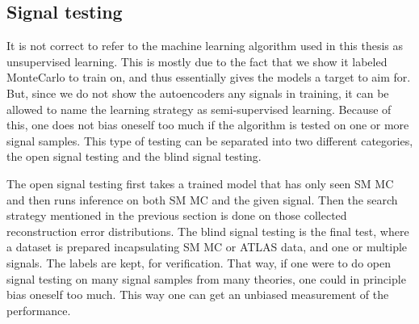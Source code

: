 \subsection*{Signal testing}
It is not correct to refer to the machine learning algorithm used in this thesis as unsupervised learning. 
This is mostly due to the fact that we show it labeled MonteCarlo to train on, and thus essentially gives 
the models a target to aim for. But, since we do not show the autoencoders any signals in training, it can be allowed to 
name the learning strategy as semi-supervised learning. Because of this, one does not bias oneself too much 
if the algorithm is tested on one or more signal samples. This type of testing can be separated into two
different categories, the open signal testing and the blind signal testing. \par 
The open signal testing first takes a trained model that has only seen SM MC and then runs inference on both 
SM MC and the given signal. Then the search strategy mentioned in the previous section is done on those 
collected reconstruction error distributions. The blind signal testing is the final test, where a dataset 
is prepared incapsulating SM MC or ATLAS data, and one or multiple signals. The labels are kept, for verification. 
That way, if one were to do open signal testing on many signal samples from many theories, one could 
in principle bias oneself too much. This way one can get an unbiased measurement of the performance. 